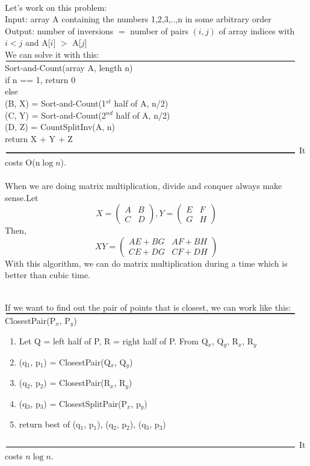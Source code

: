 \documentclass{article}
\begin{document}
\\
Let's work on this problem:\\
Input: array A containing the numbers 1,2,3,..,n in some arbitrary order\\
Output: number of inversions $=$ number of pairs $(i,j)$ of array indices with
$i < j$ and A[$i$] $>$ A[$j$]\\
We can solve it with this:\\
$\rule{\textwidth}{0.3mm}$
Sort-and-Count(array A, length n)\\
if n == 1, return 0\\
else\\
(B, X) = Sort-and-Count(1$^{st}$ half of A, n/2)\\
(C, Y) = Sort-and-Count(2$^{nd}$ half of A, n/2)\\
(D, Z) = CountSplitInv(A, n)\\
return X + Y + Z\\
$\rule{\textwidth}{0.3mm}$
It costs O(n$\log n$).\\

\\
When we are doing matrix multiplication, divide and conquer always make sense.Let
\[ X = \begin{pmatrix}
A & B\\
C & D
\end{pmatrix},
Y = \begin{pmatrix}
E & F\\
G & H
\end{pmatrix}\]
Then,
\[ XY = \begin{pmatrix}
AE + BG & AF + BH\\
CE + DG & CF + DH
\end{pmatrix}\]
With this algorithm, we can do matrix multiplication during a time which is better than cubic time.

\\
If we want to find out the pair of points that is closest, we can work like this:\\
$\rule{\textwidth}{0.3mm}$
ClosestPair(P$_x$, P$_y$)
\begin{enumerate}
  \item Let Q = left half of P, R = right half of P. From Q$_x$, Q$_y$, R$_x$, R$_y$
  \item (q$_1$, p$_1$) = ClosestPair(Q$_x$, Q$_y$)
  \item (q$_2$, p$_2$) = ClosestPair(R$_x$, R$_y$)
  \item (q$_3$, p$_3$) = ClosestSplitPair(P$_x$, p$_y$)
  \item return best of (q$_1$, p$_1$), (q$_2$, p$_2$), (q$_3$, p$_3$)
\end{enumerate}
$\rule{\textwidth}{0.3mm}$
It costs $n\log n$.
\end{document}
